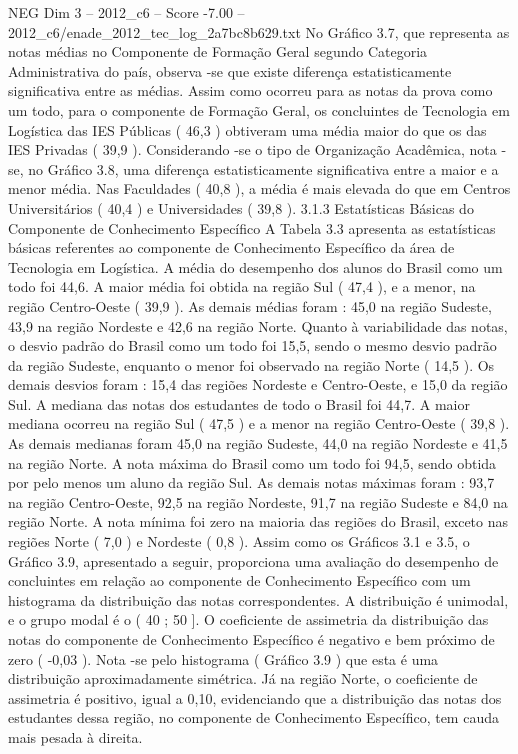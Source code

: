 \begin{textsample}{NEG Dim 3 – 2012\_c6 – Score -7.00 – 2012\_c6/enade\_2012\_tec\_log\_2a7bc8b629.txt}
No Gráfico 3.7, que representa as notas médias no Componente de Formação Geral segundo Categoria Administrativa do país, observa -se que existe diferença estatisticamente significativa entre as médias.
Assim como ocorreu para as notas da prova como um todo, para o componente de Formação Geral, os concluintes de Tecnologia em Logística das IES Públicas ( 46,3 ) obtiveram uma média maior do que os das IES Privadas ( 39,9 ).
Considerando -se o tipo de Organização Acadêmica, nota -se, no Gráfico 3.8, uma diferença estatisticamente significativa entre a maior e a menor média.
Nas Faculdades ( 40,8 ), a média é mais elevada do que em Centros Universitários ( 40,4 ) e Universidades ( 39,8 ). 3.1.3 Estatísticas Básicas do Componente de Conhecimento Específico A Tabela 3.3 apresenta as estatísticas básicas referentes ao componente de Conhecimento Específico da área de Tecnologia em Logística.
A média do desempenho dos alunos do Brasil como um todo foi 44,6.
A maior média foi obtida na região Sul ( 47,4 ), e a menor, na região Centro-Oeste ( 39,9 ).
As demais médias foram : 45,0 na região Sudeste, 43,9 na região Nordeste e 42,6 na região Norte.
Quanto à variabilidade das notas, o desvio padrão do Brasil como um todo foi 15,5, sendo o mesmo desvio padrão da região Sudeste, enquanto o menor foi observado na região Norte ( 14,5 ).
Os demais desvios foram : 15,4 das regiões Nordeste e Centro-Oeste, e 15,0 da região Sul.
A mediana das notas dos estudantes de todo o Brasil foi 44,7.
A maior mediana ocorreu na região Sul ( 47,5 ) e a menor na região Centro-Oeste ( 39,8 ).
As demais medianas foram 45,0 na região Sudeste, 44,0 na região Nordeste e 41,5 na região Norte.
A nota máxima do Brasil como um todo foi 94,5, sendo obtida por pelo menos um aluno da região Sul.
As demais notas máximas foram : 93,7 na região Centro-Oeste, 92,5 na região Nordeste, 91,7 na região Sudeste e 84,0 na região Norte.
A nota mínima foi zero na maioria das regiões do Brasil, exceto nas regiões Norte ( 7,0 ) e Nordeste ( 0,8 ).
Assim como os Gráficos 3.1 e 3.5, o Gráfico 3.9, apresentado a seguir, proporciona uma avaliação do desempenho de concluintes em relação ao componente de Conhecimento Específico com um histograma da distribuição das notas correspondentes.
A distribuição é unimodal, e o grupo modal é o ( 40 ; 50 ].
O coeficiente de assimetria da distribuição das notas do componente de Conhecimento Específico é negativo e bem próximo de zero ( -0,03 ).
Nota -se pelo histograma ( Gráfico 3.9 ) que esta é uma distribuição aproximadamente simétrica.
Já na região Norte, o coeficiente de assimetria é positivo, igual a 0,10, evidenciando que a distribuição das notas dos estudantes dessa região, no componente de Conhecimento Específico, tem cauda mais pesada à direita.

\end{textsample}
